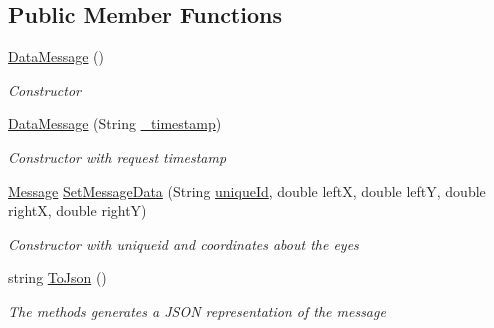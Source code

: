 \subsection*{Public Member Functions}
\begin{DoxyCompactItemize}
\item 
\hyperlink{class_web_analyzer_1_1_models_1_1_message_model_1_1_data_message_a3596e43b8f10bd9d32a939875cf9cfea}{Data\+Message} ()
\begin{DoxyCompactList}\small\item\em Constructor \end{DoxyCompactList}\item 
\hyperlink{class_web_analyzer_1_1_models_1_1_message_model_1_1_data_message_ac53ee1357e1980fd25ebeae30cee1014}{Data\+Message} (String \hyperlink{class_web_analyzer_1_1_models_1_1_message_model_1_1_message_ae1e243f35e213e08ec2bdc54f64b0d2e}{\+\_\+timestamp})
\begin{DoxyCompactList}\small\item\em Constructor with request timestamp \end{DoxyCompactList}\item 
\hyperlink{class_web_analyzer_1_1_models_1_1_message_model_1_1_message}{Message} \hyperlink{class_web_analyzer_1_1_models_1_1_message_model_1_1_data_message_ae33b7a50587d1e3579881f21660ac450}{Set\+Message\+Data} (String \hyperlink{_u_i_2_h_t_m_l_resources_2js_2lib_2underscore_8min_8js_af690ff5521d79c7128861033ae80ae17}{unique\+Id}, double left\+X, double left\+Y, double right\+X, double right\+Y)
\begin{DoxyCompactList}\small\item\em Constructor with uniqueid and coordinates about the eyes \end{DoxyCompactList}\item 
string \hyperlink{class_web_analyzer_1_1_models_1_1_message_model_1_1_data_message_a0bd5c0828f6293f800603e292af890ce}{To\+Json} ()
\begin{DoxyCompactList}\small\item\em The methods generates a J\+S\+O\+N representation of the message \end{DoxyCompactList}\end{DoxyCompactItemize}
